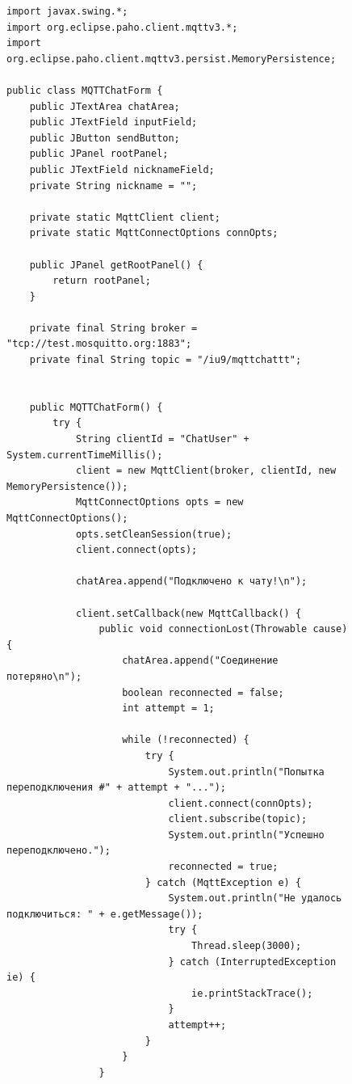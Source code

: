 \documentclass[a4paper, 14pt]{extarticle}
\begin{document}
\newpage
\begin{figure}[!htb]
\begin{lstlisting}[language={},caption={реализация с swing Ui designer},label={lst:code4}]
import javax.swing.*;
import org.eclipse.paho.client.mqttv3.*;
import org.eclipse.paho.client.mqttv3.persist.MemoryPersistence;

public class MQTTChatForm {
    public JTextArea chatArea;
    public JTextField inputField;
    public JButton sendButton;
    public JPanel rootPanel;
    public JTextField nicknameField;
    private String nickname = "";

    private static MqttClient client;
    private static MqttConnectOptions connOpts;

    public JPanel getRootPanel() {
        return rootPanel;
    }

    private final String broker = "tcp://test.mosquitto.org:1883";
    private final String topic = "/iu9/mqttchattt";


    public MQTTChatForm() {
        try {
            String clientId = "ChatUser" + System.currentTimeMillis();
            client = new MqttClient(broker, clientId, new MemoryPersistence());
            MqttConnectOptions opts = new MqttConnectOptions();
            opts.setCleanSession(true);
            client.connect(opts);

            chatArea.append("Подключено к чату!\n");

            client.setCallback(new MqttCallback() {
                public void connectionLost(Throwable cause) {
                    chatArea.append("Соединение потеряно\n");
                    boolean reconnected = false;
                    int attempt = 1;

                    while (!reconnected) {
                        try {
                            System.out.println("Попытка переподключения #" + attempt + "...");
                            client.connect(connOpts);
                            client.subscribe(topic);
                            System.out.println("Успешно переподключено.");
                            reconnected = true;
                        } catch (MqttException e) {
                            System.out.println("Не удалось подключиться: " + e.getMessage());
                            try {
                                Thread.sleep(3000);
                            } catch (InterruptedException ie) {
                                ie.printStackTrace();
                            }
                            attempt++;
                        }
                    }
                }


\end{lstlisting}
\end{figure}
\end{document}
